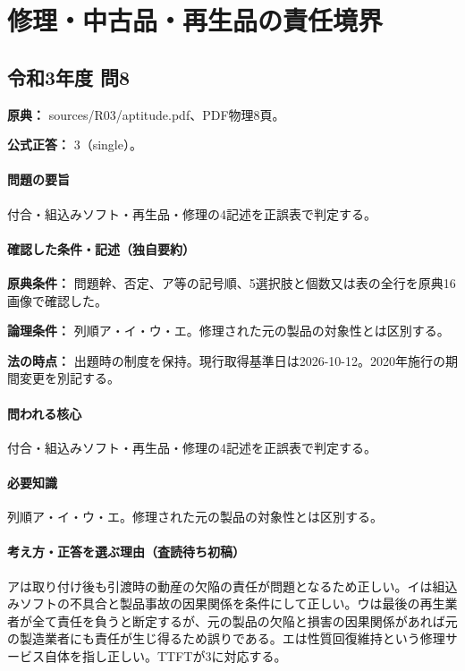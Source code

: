 \section{修理・中古品・再生品の責任境界}

\subsection{令和3年度 問8}
\label{q:r03-reg-apt-08}

\noindent\textbf{原典：} sources/R03/aptitude.pdf、PDF物理8頁。

\textbf{公式正答：} 3（single）。

\paragraph{問題の要旨} 付合・組込みソフト・再生品・修理の4記述を正誤表で判定する。

\paragraph{確認した条件・記述（独自要約）}\mbox{}\par

\noindent\textbf{原典条件：} 問題幹、否定、ア等の記号順、5選択肢と個数又は表の全行を原典16画像で確認した。\par

\noindent\textbf{論理条件：} 列順ア・イ・ウ・エ。修理された元の製品の対象性とは区別する。\par

\noindent\textbf{法の時点：} 出題時の制度を保持。現行取得基準日は2026-10-12。2020年施行の期間変更を別記する。\par

\paragraph{問われる核心} 付合・組込みソフト・再生品・修理の4記述を正誤表で判定する。

\paragraph{必要知識} 列順ア・イ・ウ・エ。修理された元の製品の対象性とは区別する。

\paragraph{考え方・正答を選ぶ理由（査読待ち初稿）} アは取り付け後も引渡時の動産の欠陥の責任が問題となるため正しい。イは組込みソフトの不具合と製品事故の因果関係を条件にして正しい。ウは最後の再生業者が全て責任を負うと断定するが、元の製品の欠陥と損害の因果関係があれば元の製造業者にも責任が生じ得るため誤りである。エは性質回復維持という修理サービス自体を指し正しい。TTFTが3に対応する。


